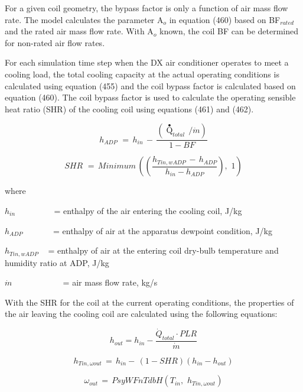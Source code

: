 For a given coil geometry, the bypass factor is only a function of air mass flow rate. The model calculates the parameter A\(_{o}\) in equation (460) based on BF\(_{rated}\) and the rated air mass flow rate. With A\(_{o}\) known, the coil BF can be determined for non-rated air flow rates.

For each simulation time step when the DX air conditioner operates to meet a cooling load, the total cooling capacity at the actual operating conditions is calculated using equation (455) and the coil bypass factor is calculated based on equation (460). The coil bypass factor is used to calculate the operating sensible heat ratio (SHR) of the cooling coil using equations (461) and (462).

\begin{equation}
{h_{ADP}}\,\, = \,{h_{in}}\, - \,\frac{{({{\mathop Q\limits^ \bullet  }_{total}}\,/\dot m)}}{{1 - BF}}
\end{equation}

\begin{equation}
SHR\,\, = \,Minimum\,\left( {\left( {\frac{{{h_{Tin,wADP}}\, - \,{h_{ADP}}}}{{{h_{in}} - {h_{ADP}}}}} \right),\,\,1} \right)
\end{equation}

where

\({h_{in}}\) ~~~~~~~~ = enthalpy of the air entering the cooling coil, J/kg

\({h_{ADP}}\) ~~~~~~ = enthalpy of air at the apparatus dewpoint condition, J/kg

\({h_{Tin,wADP}}\) ~ = enthalpy of air at the entering coil dry-bulb temperature and humidity ratio at ADP, J/kg

\(\dot m\) ~~~~~~~~~~~ = air mass flow rate, kg/s

With the SHR for the coil at the current operating conditions, the properties of the air leaving the cooling coil are calculated using the following equations:

\begin{equation}
 h_{out} = h_{in} - \frac{\dot{Q}_{total}\cdot PLR}{\dot{m}}
\end{equation}

\begin{equation}
{h_{Tin,\omega out}}\, = \,{h_{in}} - \,\left( {1 - SHR} \right)\left( {{h_{in}} - {h_{out}}} \right)
\end{equation}

\begin{equation}
{\omega_{out}}\, = \,PsyWFnTdbH({T_{in}},\,\,{h_{Tin,\omega out}})
\end{equation}

